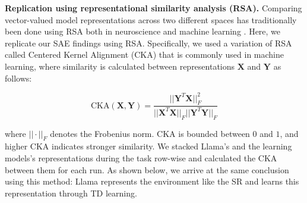 \documentclass{article} %
\begin{document}
\textbf{Replication using representational similarity analysis (RSA).} Comparing vector-valued model representations across two different spaces has traditionally been done using RSA both in neuroscience \citep{kriegeskorte2008representational} and machine learning \citep{yousefi2024decoding}. Here, we replicate our SAE findings using RSA. Specifically, we used a variation of RSA called Centered Kernel Alignment \citep{kornblith2019similarity} (CKA) that is commonly used in machine learning,  where similarity is calculated between representations $\mathbf{X}$ and $\mathbf{Y}$ as follows: 

\begin{equation}\label{eq:cka}
\mathrm{CKA}(\mathbf{X},\mathbf{Y}) = \dfrac{||\mathbf{Y}^T \mathbf{X}||^2_F}{||\mathbf{X}^T\mathbf{X}||_F||\mathbf{Y}^T\mathbf{Y}||_F} 
\end{equation}

where $||\cdot||_F$ denotes the Frobenius norm. CKA is bounded between $0$ and $1$, and higher CKA indicates stronger similarity. We stacked Llama's and the learning models's representations during the task row-wise and calculated the CKA between them for each run. As shown below, we arrive at the same conclusion using this method: Llama represents the environment like the SR and learns this representation through TD learning.
\end{document}
